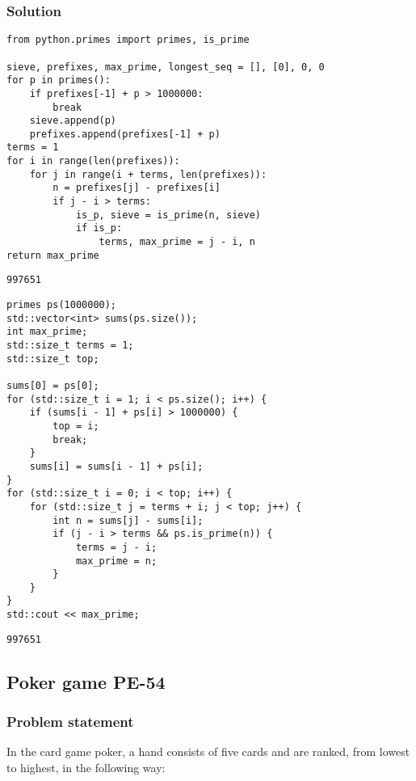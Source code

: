 \documentclass[11pt]{article}
\begin{document}
\subsubsection{Solution}
\label{sec:orgheadline12}
\begin{verbatim}
from python.primes import primes, is_prime

sieve, prefixes, max_prime, longest_seq = [], [0], 0, 0
for p in primes():
    if prefixes[-1] + p > 1000000:
        break
    sieve.append(p)
    prefixes.append(prefixes[-1] + p)
terms = 1
for i in range(len(prefixes)):
    for j in range(i + terms, len(prefixes)):
        n = prefixes[j] - prefixes[i]
        if j - i > terms:
            is_p, sieve = is_prime(n, sieve)
            if is_p:
                terms, max_prime = j - i, n
return max_prime
\end{verbatim}

\begin{verbatim}
997651
\end{verbatim}

\begin{verbatim}
primes ps(1000000);
std::vector<int> sums(ps.size());
int max_prime;
std::size_t terms = 1;
std::size_t top;

sums[0] = ps[0];
for (std::size_t i = 1; i < ps.size(); i++) {
    if (sums[i - 1] + ps[i] > 1000000) {
        top = i;
        break;
    }
    sums[i] = sums[i - 1] + ps[i];
}
for (std::size_t i = 0; i < top; i++) {
    for (std::size_t j = terms + i; j < top; j++) {
        int n = sums[j] - sums[i];
        if (j - i > terms && ps.is_prime(n)) {
            terms = j - i;
            max_prime = n;
        }
    }
}
std::cout << max_prime;
\end{verbatim}

\begin{verbatim}
997651
\end{verbatim}

\subsection{Poker game PE-54}
\label{sec:orgheadline17}
\subsubsection{Problem statement}
\label{sec:orgheadline14}
In the card game poker, a hand consists of five cards 
and are ranked, from lowest to highest, in the following way:
\end{document}
